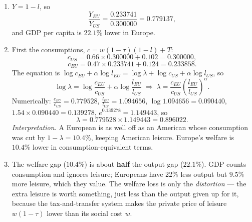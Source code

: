 \documentclass[12pt, letterpaper]{article}
\begin{document}
\begin{tcolorbox}[oddbox,title={Problem 7.5 \quad Prescott's Calculation}]
\begin{enumerate}
\emph{Exact balanced budget.} Setting $T=\tau w(1-l)$ in (b):
$(1+\alpha)(1-\tau)\,l=\alpha(1-\tau)+\alpha\tau(1-l)$, so
$l\,[(1+\alpha)(1-\tau)+\alpha\tau]=\alpha$, i.e.
\[
l=\frac{\alpha}{1+\alpha-\tau},
\]
which gives $1.54/2.20=0.700000$ for the US and $1.54/2.01=0.766169$ for Europe --- the second
differs from 0.766259 only by the rounding of $T$. With revenue rebated, leisure
\emph{rises} with $\tau$ (Figure~\ref{fig:presc75}).

\item $Y=1-l$, so
\[
\frac{Y_{EU}}{Y_{US}}=\frac{0.233741}{0.300000}=0.779137 ,
\]
and GDP per capita is $\mathbf{22.1\%}$ lower in Europe.

\item First the consumptions, $c=w(1-\tau)(1-l)+T$:
\[
c_{US}=0.66\times0.300000+0.102=0.300000,
\]
\[
c_{EU}=0.47\times0.233741+0.124=0.233858 .
\]
The equation is $\log c_{EU}+\alpha\log l_{EU}=\log\lambda+\log c_{US}+\alpha\log l_{US}$,
so
\[
\log\lambda=\log\frac{c_{EU}}{c_{US}}+\alpha\log\frac{l_{EU}}{l_{US}}
\;\Longrightarrow\;
\lambda=\frac{c_{EU}}{c_{US}}\left(\frac{l_{EU}}{l_{US}}\right)^{\alpha}.
\]
Numerically: $\frac{c_{EU}}{c_{US}}=0.779528$, $\frac{l_{EU}}{l_{US}}=1.094656$,
$\log1.094656=0.090440$, $1.54\times0.090440=0.139278$, $e^{0.139278}=1.149443$, so
\[
\lambda=0.779528\times1.149443=\boxed{0.896022}.
\]
\emph{Interpretation.} A European is as well off as an American whose consumption was cut by
$1-\lambda=\mathbf{10.4\%}$, keeping American leisure. Europe's welfare is $10.4\%$ lower in
consumption-equivalent terms.

\item The welfare gap ($10.4\%$) is about \textbf{half} the output gap ($22.1\%$). GDP counts
consumption and ignores leisure; Europeans have 22\% less output but $9.5\%$ more leisure,
which they value. The welfare loss is only the \emph{distortion} --- the extra leisure is worth
something, just less than the output given up for it, because the tax-and-transfer system
makes the private price of leisure $w(1-\tau)$ lower than its social cost $w$.


\end{enumerate}
\end{tcolorbox}
\end{document}
